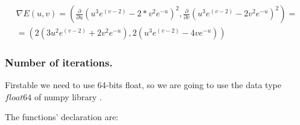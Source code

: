 \begin{multline*}
  \nabla E(u,v) = \left( \frac{\partial}{\partial u}(u^3 e^{(v-2)} - 2* v^2 e^{-u})^2 , \frac{\partial}{\partial v} (u^3 e^{(v-2)} - 2 v^2 e^{-u})^2 \right) = \\
 =  \left(2(3u^2e^{(v-2)} + 2 v^2 e^{-u} ), 2(u^3 e^{(v-2)} - 4 v e^{-u}) \right)
\end{multline*}


\subsubsection{Number of iterations.}

Firstable we need to use 64-bits float, so we are going to use the data type $float64$ of numpy library \cite{float64}.

The functions' declaration are:

\begin{verbatim}
\end{verbatim}